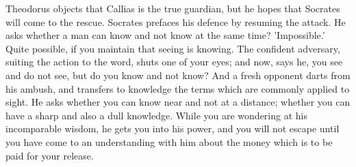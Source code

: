 \documentclass[11pt,letter]{article}
\begin{document}
\par  Theodorus objects that Callias is the true guardian, but he hopes that Socrates will come to the rescue. Socrates prefaces his defence by resuming the attack. He asks whether a man can know and not know at the same time? 'Impossible.' Quite possible, if you maintain that seeing is knowing. The confident adversary, suiting the action to the word, shuts one of your eyes; and now, says he, you see and do not see, but do you know and not know? And a fresh opponent darts from his ambush, and transfers to knowledge the terms which are commonly applied to sight. He asks whether you can know near and not at a distance; whether you can have a sharp and also a dull knowledge. While you are wondering at his incomparable wisdom, he gets you into his power, and you will not escape until you have come to an understanding with him about the money which is to be paid for your release.
\end{document}
